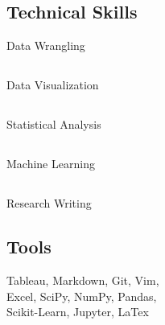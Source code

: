 \documentclass[]{sahana}
\begin{document}
\begin{minipage}[t]{0.33\textwidth}
\subsection{}\vspace{-12pt}
\vspace{6pt}
\subsection{Technical Skills}
Data Wrangling \hfill{}\hspace{30pt}
\subsection{}\vspace{-12pt}
Data Visualization \hfill{}\hspace{30pt}
\subsection{}\vspace{-12pt}
Statistical Analysis \hfill{}\hspace{30pt}
\subsection{}\vspace{-12pt}
Machine Learning \hfill{}\hspace{30pt}
\subsection{}\vspace{-12pt}
Research Writing \hfill{}\hspace{30pt}
\subsection{}\vspace{-12pt}
\vspace{6pt}
\subsection{Tools}
Tableau, Markdown, Git, Vim,\\ Excel, SciPy, NumPy, Pandas, \\ Scikit-Learn, Jupyter, LaTex


\sectionsep

%
%

\end{minipage} 
\end{document}

